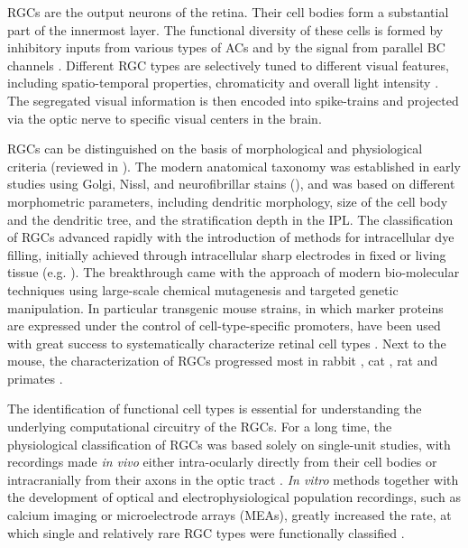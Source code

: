 RGCs are the output neurons of the retina. Their cell bodies form a substantial part of the innermost layer. The functional diversity of these cells is formed by inhibitory inputs from various types of ACs \citep{oelveczky03, wassle04} and by the signal from parallel BC channels \citep{baden13}. Different RGC types are selectively tuned to different visual features, including spatio-temporal properties, chromaticity and overall light intensity \citep{gollisch09}. The segregated visual information is then encoded into spike-trains and projected via the optic nerve to specific visual centers in the brain. 

RGCs can be distinguished on the basis of morphological and physiological criteria (reviewed in \citealp{berson08}). The modern anatomical taxonomy was established in early studies using Golgi, Nissl, and neurofibrillar stains (\citealp{stone83}), and was based on different morphometric parameters, including dendritic morphology, size of the cell body and the dendritic tree, and the stratification depth in the IPL. The classification of RGCs advanced rapidly with the introduction of methods for intracellular dye filling, initially achieved through intracellular sharp electrodes in fixed or living tissue (e.g. \citealp{buhl86, pu90}). The breakthrough came with the approach of modern bio-molecular techniques using large-scale chemical mutagenesis and targeted genetic manipulation. In particular transgenic mouse strains, in which marker proteins are expressed under the control of cell-type-specific promoters, have been used with great success to systematically characterize retinal cell types \citep{badea04, coombs06, kong05}. Next to the mouse, the characterization of RGCs progressed most in rabbit \citep{rockhill02}, cat \citep{brien02}, rat \citep{huxlin97} and primates \citep{dacey94, yamada96}. 

The identification of functional cell types is essential for understanding the underlying computational circuitry of the RGCs. For a long time, the physiological classification of RGCs was based solely on single-unit studies, with recordings made \emph{in vivo} either intra-ocularly \citep{barlow64} directly from their cell bodies or intracranially from their axons in the optic tract \citep{enroth66}. \emph{In vitro} methods together with the development of optical and electrophysiological population recordings, such as calcium imaging or microelectrode arrays (MEAs), greatly increased the rate, at which single and relatively rare RGC types were functionally classified \citep{devries97}. 


